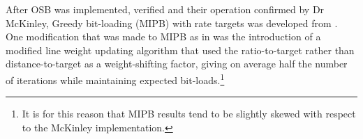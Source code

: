 After OSB was implemented, verified and their operation confirmed by Dr McKinley, Greedy bit-loading (MIPB) with rate targets was developed from \cite{AM09}. One modification that was made to MIPB as in \cite{AM09} was the introduction of a modified line weight updating algorithm that used the ratio-to-target rather than distance-to-target as a weight-shifting factor, giving on average half the number of iterations while maintaining expected bit-loads.\footnote{It is for this reason that MIPB results tend to be slightly skewed with respect to the McKinley implementation.}

